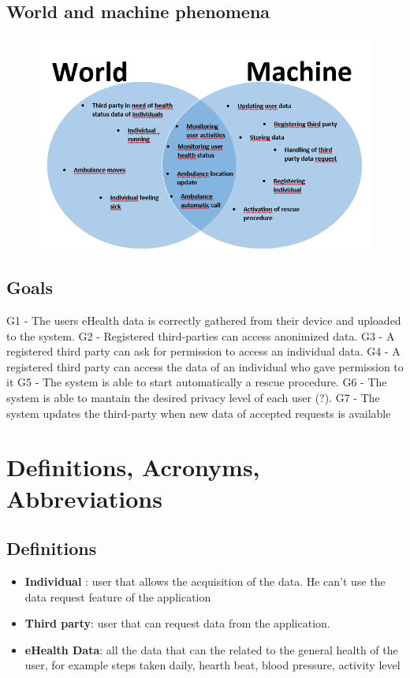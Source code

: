 \subsection{World and machine phenomena}
\begin{figure}
\centering
\includegraphics[scale=0.7]{img/phenomena.png}
\end{figure}


\subsection{Goals}
G1 - The users eHealth data is  correctly gathered from their device and uploaded to the system.
 \newline
G2 - Registered third-parties can access anonimized data.
 \newline
G3 - A registered third party can ask for permission to access an individual data.
 \newline
G4 - A registered third party can access the data of an individual who gave permission to it
 \newline
G5 - The system is able to start automatically a rescue procedure.
 \newline
G6 - The system is able to mantain the desired privacy level of each user (?).
 \newline
G7 - The system updates the third-party when new data of accepted requests is available
\section{Definitions, Acronyms, Abbreviations}
\subsection{Definitions}
\begin{itemize}
\item \textbf{Individual} : user that allows the acquisition of the data. He can't use the data request feature of the application
\item \textbf{Third party}: user that can request data from the application.
\item \textbf{eHealth Data}: all the data that can the related to the general health of the user, for example steps taken daily, hearth beat, blood pressure, activity level
\end{itemize}
